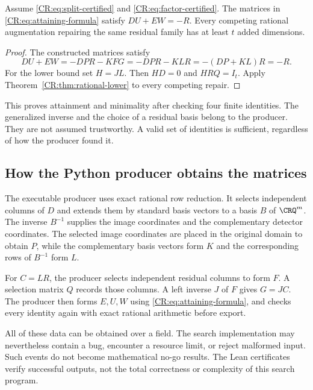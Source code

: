 \begin{CRtheorem}\label{CR:thm:matrix-attainment}
Assume \eqref{CR:eq:split-certified} and \eqref{CR:eq:factor-certified}. The matrices in \eqref{CR:eq:attaining-formula} satisfy $DU+EW=-R$. Every competing rational augmentation repairing the same residual family has at least $t$ added dimensions.
\end{CRtheorem}
\begin{proof}
The constructed matrices satisfy
\[
 DU+EW=-DPR-KFG=-DPR-KLR=-(DP+KL)R=-R.
\]
For the lower bound set $H=JL$. Then $HD=0$ and $HRQ=I_t$. Apply Theorem~\ref{CR:thm:rational-lower} to every competing repair.
\end{proof}

This proves attainment and minimality after checking four finite identities. The generalized inverse and the choice of a residual basis belong to the producer. They are not assumed trustworthy. A valid set of identities is sufficient, regardless of how the producer found it.

\subsection{How the Python producer obtains the matrices}
The executable producer uses exact rational row reduction. It selects independent columns of $D$ and extends them by standard basis vectors to a basis $B$ of $\CRQ^m$. The inverse $B^{-1}$ supplies the image coordinates and the complementary detector coordinates. The selected image coordinates are placed in the original domain to obtain $P$, while the complementary basis vectors form $K$ and the corresponding rows of $B^{-1}$ form $L$.

For $C=LR$, the producer selects independent residual columns to form $F$. A selection matrix $Q$ records those columns. A left inverse $J$ of $F$ gives $G=JC$. The producer then forms $E,U,W$ using \eqref{CR:eq:attaining-formula}, and checks every identity again with exact rational arithmetic before export.

All of these data can be obtained over a field. The search implementation may nevertheless contain a bug, encounter a resource limit, or reject malformed input. Such events do not become mathematical no-go results. The Lean certificates verify successful outputs, not the total correctness or complexity of this search program.


